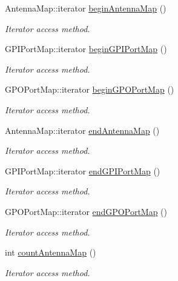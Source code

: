 {\bf }\par
\begin{DoxyCompactItemize}
\item 
Antenna\-Map\-::iterator \hyperlink{class_e_l_f_i_n_1_1_stub_reader_a32893abad1cceff7cac16b5a70f33c76}{begin\-Antenna\-Map} ()
\begin{DoxyCompactList}\small\item\em Iterator access method. \end{DoxyCompactList}\item 
G\-P\-I\-Port\-Map\-::iterator \hyperlink{class_e_l_f_i_n_1_1_stub_reader_abbac628834cf80d822b0438c8c6c59cd}{begin\-G\-P\-I\-Port\-Map} ()
\begin{DoxyCompactList}\small\item\em Iterator access method. \end{DoxyCompactList}\item 
G\-P\-O\-Port\-Map\-::iterator \hyperlink{class_e_l_f_i_n_1_1_stub_reader_a4c4728e39811cce09cb14238d6c40f62}{begin\-G\-P\-O\-Port\-Map} ()
\begin{DoxyCompactList}\small\item\em Iterator access method. \end{DoxyCompactList}\item 
Antenna\-Map\-::iterator \hyperlink{class_e_l_f_i_n_1_1_stub_reader_aec9a2db3d0e94a941a63177e6b11df33}{end\-Antenna\-Map} ()
\begin{DoxyCompactList}\small\item\em Iterator access method. \end{DoxyCompactList}\item 
G\-P\-I\-Port\-Map\-::iterator \hyperlink{class_e_l_f_i_n_1_1_stub_reader_a2eafaf5236101ae79460217248e431f8}{end\-G\-P\-I\-Port\-Map} ()
\begin{DoxyCompactList}\small\item\em Iterator access method. \end{DoxyCompactList}\item 
G\-P\-O\-Port\-Map\-::iterator \hyperlink{class_e_l_f_i_n_1_1_stub_reader_a625a538fc3b61f6218d98544a4da8902}{end\-G\-P\-O\-Port\-Map} ()
\begin{DoxyCompactList}\small\item\em Iterator access method. \end{DoxyCompactList}\item 
int \hyperlink{class_e_l_f_i_n_1_1_stub_reader_af689c9f11d4aa3e74cbf242ed0fa1c02}{count\-Antenna\-Map} ()
\begin{DoxyCompactList}\small\item\em Iterator access method. \end{DoxyCompactList}\item 

\end{DoxyCompactItemize}
